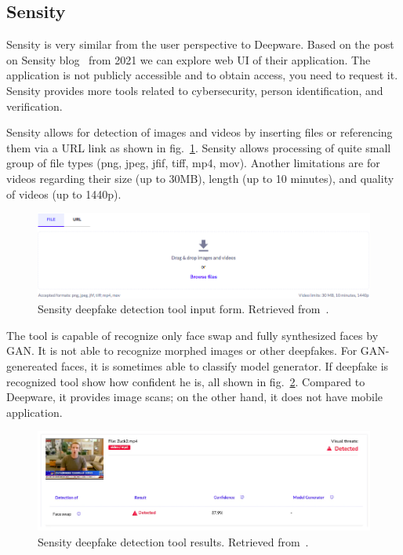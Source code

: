 \subsection{Sensity}

Sensity is very similar from the user perspective to Deepware. Based on the post on Sensity blog~\cite{HowToDetectADeepfakeOnline} from 2021 we can explore web UI of their application. The application is not publicly accessible and to obtain access, you need to request it. Sensity provides more tools related to cybersecurity, person identification, and verification. 

Sensity allows for detection of images and videos by inserting files or referencing them via a URL link as shown in fig.~\ref{fig:sensity_input}. Sensity allows processing of quite small group of file types (png, jpeg, jfif, tiff, mp4, mov). Another limitations are for videos regarding their size (up to 30MB), length (up to 10 minutes), and quality of videos (up to 1440p).~\cite{HowToDetectADeepfakeOnline}

\begin{figure}[H]
    \centering
    \includegraphics[width=.95\linewidth]{other-fig/sensity_input.png}
    \caption{Sensity deepfake detection tool input form. Retrieved from~\cite{HowToDetectADeepfakeOnline}.}
    \label{fig:sensity_input}
\end{figure}

The tool is capable of recognize only face swap and fully synthesized faces by GAN. It is not able to recognize morphed images or other deepfakes. For GAN-genereated faces, it is sometimes able to classify model generator. If deepfake is recognized tool show how confident he is, all shown in fig.~\ref{fig:sensity_results}. Compared to Deepware, it provides image scans; on the other hand, it does not have mobile application.

\begin{figure}[H]
    \centering
    \includegraphics[width=.95\linewidth]{other-fig/sensity_results.png}
    \caption{Sensity deepfake detection tool results. Retrieved from~\cite{HowToDetectADeepfakeOnline}.}
    \label{fig:sensity_results}
\end{figure}

